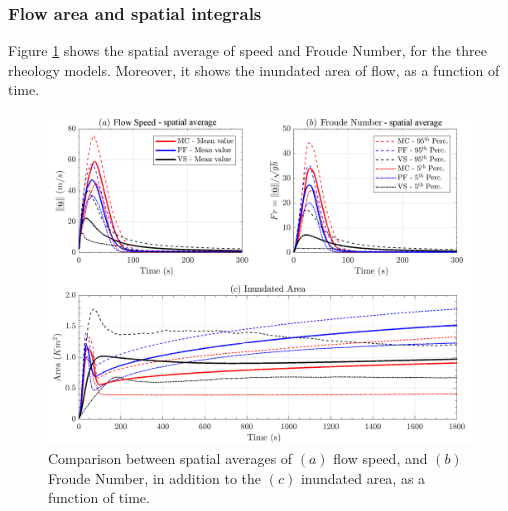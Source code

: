 \documentclass{article}
\begin{document}
\subsubsection{Flow area and spatial integrals}
Figure \ref{fig:Colima-spatial} shows the spatial average of speed and Froude Number, for the three rheology models. Moreover, it shows the inundated area of flow, as a function of time.
\begin{figure}[H]
        \centering
        \includegraphics[width=1\textwidth]{BAF_VolcanDeColima/AveragedMeasurments/Averaged_MeasuresColima.png}
        \caption{Comparison between spatial averages of $(a)$ flow speed, and $(b)$ Froude Number, in addition to the $(c)$ inundated area, as a function of time.}
        \label{fig:Colima-spatial}
\end{figure}
\end{document}
